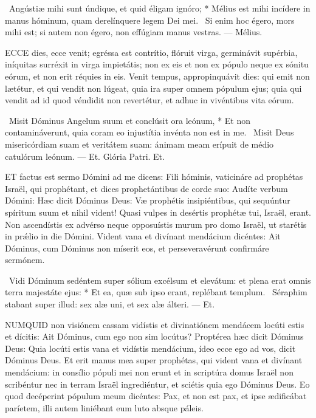 \R\ Angústiæ mihi sunt úndique, et quid éligam ignóro; * Mélius est mihi incídere in manus hóminum, quam derelínquere legem Dei mei. \V\ Si enim hoc égero, mors mihi est; si autem non égero, non effúgiam manus vestras. — Mélius.



\lettrine[lines=2]{E}{CCE} dies, ecce venit; egréssa est contrítio, flóruit virga, germinávit supérbia, iníquitas surréxit in virga impietátis; non ex eis et non ex pópulo neque ex sónitu eórum, et non erit réquies in eis. Venit tempus, appropinquávit dies: qui emit non lætétur, et qui vendit non lúgeat, quia ira super omnem pópulum ejus; quia qui vendit ad id quod véndidit non revertétur, et adhuc in vivéntibus vita eórum.

\R\ Misit Dóminus Angelum suum et conclúsit ora leónum, * Et non contamináverunt, quia coram eo injustítia invénta non est in me. \V\ Misit Deus misericórdiam suam et veritátem suam: ánimam meam erípuit de médio catulórum leónum. — Et. Glória Patri. Et.




\lettrine[lines=2]{E}{T} factus est sermo Dómini ad me dicens: Fili hóminis, vaticináre ad prophétas Israël, qui prophétant, et dices prophetántibus de corde suo: Audíte verbum Dómini: Hæc dicit Dóminus Deus: Væ prophétis insipiéntibus, qui sequúntur spíritum suum et nihil vident! Quasi vulpes in desértis prophétæ tui, Israël, erant. Non ascendístis ex advérso neque opposuístis murum pro domo Israël, ut starétis in prǽlio in die Dómini. Vident vana et divínant mendácium dicéntes: Ait Dóminus, cum Dóminus non míserit eos, et perseveravérunt confirmáre sermónem.

\R\ Vidi Dóminum sedéntem super sólium excélsum et elevátum: et plena erat omnis terra majestáte ejus: * Et ea, quæ sub ipso erant, replébant templum. \V\ Séraphim stabant super illud: sex alæ uni, et sex alæ álteri. — Et.


\lettrine[lines=2]{N}{UMQUID} non visiónem cassam vidístis et divinatiónem mendácem locúti estis et dícitis: Ait Dóminus, cum ego non sim locútus? Proptérea hæc dicit Dóminus Deus: Quia locúti estis vana et vidístis mendácium, ídeo ecce ego ad vos, dicit Dóminus Deus. Et erit manus mea super prophétas, qui vident vana et divínant mendácium: in consílio pópuli mei non erunt et in scriptúra domus Israël non scribéntur nec in terram Israël ingrediéntur, et sciétis quia ego Dóminus Deus. Eo quod decéperint pópulum meum dicéntes: Pax, et non est pax, et ipse ædificábat paríetem, illi autem liniébant eum luto absque páleis.

